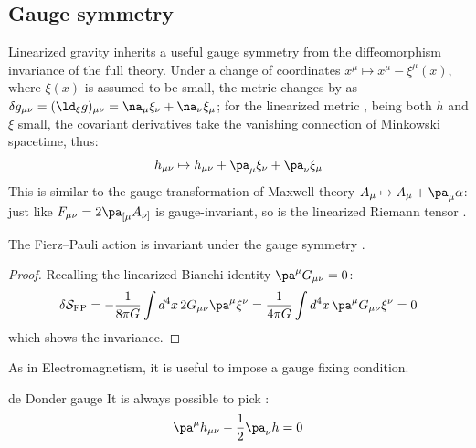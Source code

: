 \subsection{Gauge symmetry}

Linearized gravity inherits a useful gauge symmetry from the diffeomorphism invariance of the full theory. Under a change of coordinates $ x^\mu \mapsto x^\mu - \xi^\mu(x) $, where $ \xi(x) $ is assumed to be small, the metric changes by  as $ \delta g_{\mu \nu} = (\ld_\xi g)_{\mu \nu} = \na_\mu \xi_\nu + \na_\nu \xi_\mu $; for the linearized metric , being both $ h $ and $ \xi $ small, the covariant derivatives take the vanishing connection of Minkowski spacetime, thus:
\begin{equation}
  h_{\mu \nu} \mapsto h_{\mu \nu} + \pa_\mu \xi_\nu + \pa_\nu \xi_\mu
  \label{eq:weak-gauge-tr}
\end{equation}
This is similar to the gauge transformation of Maxwell theory $ A_\mu \mapsto A_\mu + \pa_\mu \alpha $: just like $ F_{\mu \nu} = 2 \pa_{[\mu} A_{\nu]} $ is gauge-invariant, so is the linearized Riemann tensor .

\begin{proposition}{}{}
  The Fierz--Pauli action is invariant under the gauge symmetry .
\end{proposition}

\begin{proofbox}
  \begin{proof}
    Recalling the linearized Bianchi identity $ \pa^\mu G_{\mu \nu} = 0 $:
    \begin{equation*}
      \delta \mathcal{S}_{\text{FP}} = - \frac{1}{8\pi G} \int d^4 x\, 2 G_{\mu \nu} \pa^\mu \xi^\nu = \frac{1}{4\pi G} \int d^4 x\, \pa^\mu G_{\mu \nu} \xi^\nu = 0
    \end{equation*}
    which shows the invariance.
  \end{proof}
\end{proofbox}

As in Electromagnetism, it is useful to impose a gauge fixing condition.

\begin{proposition}{de Donder gauge}{}
  It is always possible to pick :
  \begin{equation}
    \pa^\mu h_{\mu \nu} - \frac{1}{2} \pa_\nu h = 0
  \end{equation}
\end{proposition}

